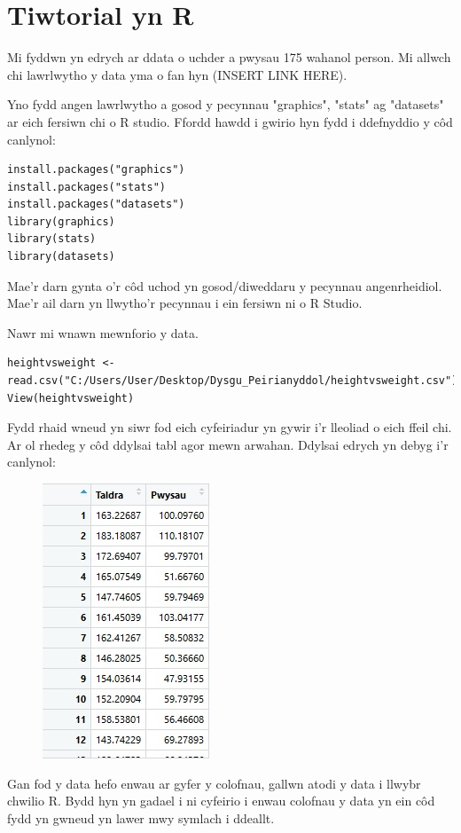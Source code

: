 \section{Tiwtorial yn R}
Mi fyddwn yn edrych ar ddata o uchder a pwysau 175 wahanol person. Mi allwch chi lawrlwytho y data yma o fan hyn (INSERT LINK HERE). 

Yno fydd angen lawrlwytho a gosod y pecynnau "graphics", "stats" ag "datasets" ar eich fersiwn chi o R studio. Ffordd hawdd i gwirio hyn fydd i ddefnyddio y c\^{o}d canlynol:

\begin{verbatim}
install.packages("graphics")
install.packages("stats")
install.packages("datasets")
library(graphics)
library(stats)
library(datasets)
\end{verbatim}
Mae'r darn gynta o'r c\^{o}d uchod yn gosod/diweddaru y pecynnau angenrheidiol. Mae'r ail darn yn llwytho'r pecynnau i ein fersiwn ni o R Studio.

Nawr mi wnawn mewnforio y data. 

\begin{verbatim}
heightvsweight <- read.csv("C:/Users/User/Desktop/Dysgu_Peirianyddol/heightvsweight.csv")
View(heightvsweight)
\end{verbatim}

Fydd rhaid wneud yn siwr fod eich cyfeiriadur yn gywir i'r lleoliad o eich ffeil chi.
Ar ol rhedeg y c\^{o}d ddylsai tabl agor mewn arwahan. Ddylsai edrych yn debyg i'r canlynol:

\begin{figure}[h!]
\includegraphics[width=0.35\linewidth]{../img/Data_yn_R.jpg}
\label{fig:DataR}
\end{figure}

Gan fod y data hefo enwau ar gyfer y colofnau, gallwn atodi y data i llwybr chwilio R. Bydd hyn yn gadael i ni cyfeirio i enwau colofnau y data yn ein c\^{o}d fydd yn gwneud yn lawer mwy symlach i ddeallt.

